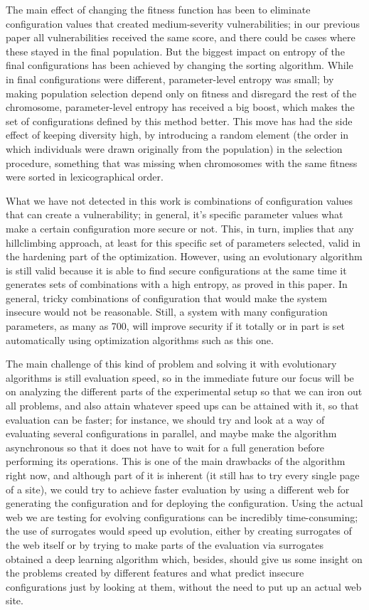 \documentclass[sigconf]{acmart}
\begin{document}
The main effect of changing the fitness function has been to eliminate
configuration values that created medium-severity vulnerabilities; in
our previous paper \cite{erseco:cec} all vulnerabilities received the
same score, and there could be cases where these stayed in the final
population. But the biggest impact on entropy of the final
configurations has been achieved by changing the sorting
algorithm. While in \cite{erseco:cec} final configurations were
different, parameter-level entropy was small; by making population
selection depend only on fitness and disregard the rest of the
chromosome, parameter-level entropy has received a big boost, which
makes the set of configurations defined by this method better. This
move has had the side effect of keeping diversity high, by introducing
a random element (the order in which individuals were drawn originally
from the population) in the selection procedure, something that was
missing when chromosomes with the same fitness were sorted in
lexicographical order.

What we have not detected in this work is combinations of
configuration values that can create a vulnerability; in general, it's
specific parameter values what make a certain configuration more
secure or not. This, in turn, implies that any hillclimbing approach,
at least for this specific set of parameters selected, valid in the
hardening part of the optimization. However, using an evolutionary
algorithm is still valid because it is able to find secure
configurations at the same time it generates sets of combinations with
a high entropy, as proved in this paper. In general, tricky
combinations of configuration that would make the system insecure
would not be reasonable. Still, a system with many configuration
parameters, as many as 700, will improve security if it totally or in
part is set automatically using optimization algorithms such as this one.

The main challenge of this kind of problem and solving it with
evolutionary algorithms is still evaluation speed, so in the immediate future our focus will be on analyzing the different
parts of the experimental setup so that we can iron out all problems,
and also attain whatever speed ups can be attained with it, so that
evaluation can be faster; for instance, we should try and look at a
way of evaluating several configurations in parallel, and maybe make
the algorithm asynchronous so that it does not have to wait for a full
generation before performing its operations. This is one of the main drawbacks of the algorithm right now,
and although part of it is inherent (it still has to try every single
page of a site), we could try to achieve faster
evaluation by using a different web for generating the configuration
and for deploying the configuration. Using the actual web we are
testing for evolving
configurations can be incredibly time-consuming; the use of surrogates
would speed up evolution, either by creating surrogates of the web
itself or by trying to make parts of the evaluation via surrogates
obtained a deep learning algorithm which, besides, should give us some
insight on the problems created by different features and what predict
insecure configurations just by looking at them, without the need to
put up an actual web site.
\end{document}
